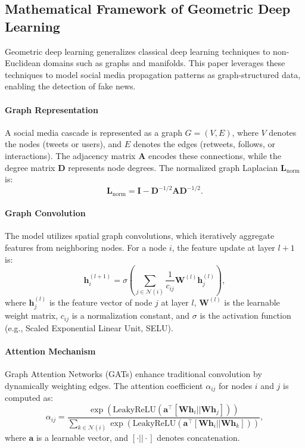 \documentclass[sigconf,nonacm]{acmart}
\begin{document}
\subsection{Mathematical Framework of Geometric Deep Learning}
Geometric deep learning generalizes classical deep learning techniques to non-Euclidean domains such as graphs and manifolds. This paper leverages these techniques to model social media propagation patterns as graph-structured data, enabling the detection of fake news.

\paragraph{Graph Representation}
A social media cascade is represented as a graph \( G = (V, E) \), where \( V \) denotes the nodes (tweets or users), and \( E \) denotes the edges (retweets, follows, or interactions). The adjacency matrix \( \bm{A} \) encodes these connections, while the degree matrix \( \bm{D} \) represents node degrees. The normalized graph Laplacian \( \bm{L}_{\text{norm}} \) is:
\[
\bm{L}_{\text{norm}} = \bm{I} - \bm{D}^{-1/2} \bm{A} \bm{D}^{-1/2}.
\]

\paragraph{Graph Convolution}
The model utilizes spatial graph convolutions, which iteratively aggregate features from neighboring nodes. For a node \( i \), the feature update at layer \( l+1 \) is:
\[
\bm{h}_i^{(l+1)} = \sigma \left( \sum_{j \in \mathcal{N}(i)} \frac{1}{c_{ij}} \bm{W}^{(l)} \bm{h}_j^{(l)} \right),
\]
where \( \bm{h}_j^{(l)} \) is the feature vector of node \( j \) at layer \( l \), \( \bm{W}^{(l)} \) is the learnable weight matrix, \( c_{ij} \) is a normalization constant, and \( \sigma \) is the activation function (e.g., Scaled Exponential Linear Unit, SELU).

\paragraph{Attention Mechanism}
Graph Attention Networks (GATs) enhance traditional convolution by dynamically weighting edges. The attention coefficient \( \alpha_{ij} \) for nodes \( i \) and \( j \) is computed as:
\[
\alpha_{ij} = \frac{\exp(\text{LeakyReLU}(\bm{a}^\top [\bm{W} \bm{h}_i || \bm{W} \bm{h}_j]))}{\sum_{k \in \mathcal{N}(i)} \exp(\text{LeakyReLU}(\bm{a}^\top [\bm{W} \bm{h}_i || \bm{W} \bm{h}_k]))},
\]
where \( \bm{a} \) is a learnable vector, and \( [\cdot || \cdot] \) denotes concatenation.
\end{document}

